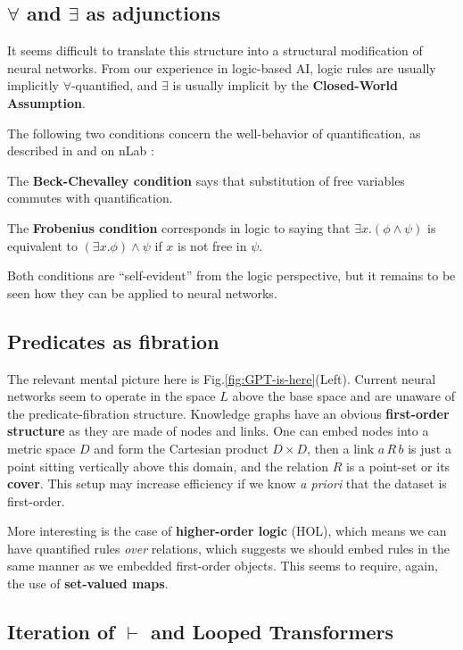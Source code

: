\documentclass[runningheads]{llncs}
\begin{document}
\subsection{$\forall$ and $\exists$ as adjunctions}

It seems difficult to translate this structure into a structural modification of neural networks.  From our experience in logic-based AI, logic rules are usually implicitly $\forall$-quantified, and $\exists$ is usually implicit by the \textbf{Closed-World Assumption}.

The following two conditions concern the well-behavior of quantification, as described in \cite{Jacobs1999} and on nLab \cite{nLab-beck-chevalley} \cite{nLab-Frobenius}:

\noindent The \textbf{Beck-Chevalley condition} says that substitution of free variables commutes with quantification.

\noindent The \textbf{Frobenius condition} corresponds in logic to saying that $\exists x. (\phi \wedge \psi)$ is equivalent to $(\exists x. \phi) \wedge \psi$ if $x$ is not free in $\psi$.

Both conditions are ``self-evident'' from the logic perspective, but it remains to be seen how they can be applied to neural networks.

\subsection{Predicates as fibration}

The relevant mental picture here is Fig.\ref{fig:GPT-is-here}(Left). Current neural networks seem to operate in the space $L$ above the base space and are unaware of the predicate-fibration structure.  Knowledge graphs have an obvious \textbf{first-order structure} as they are made of nodes and links.  One can embed nodes into a metric space $D$ and form the Cartesian product $D \times D$, then a link $a\,R\,b$ is just a point sitting vertically above this domain, and the relation $R$ is a point-set or its \textbf{cover}.  This setup may increase efficiency if we know \textit{a priori} that the dataset is first-order.

More interesting is the case of \textbf{higher-order logic} (HOL), which means we can have quantified rules \textit{over} relations, which suggests we should embed rules in the same manner as we embedded first-order objects.  This seems to require, again, the use of \textbf{set-valued maps}.

\subsection{Iteration of $\vdash$ and Looped Transformers}
\end{document}
